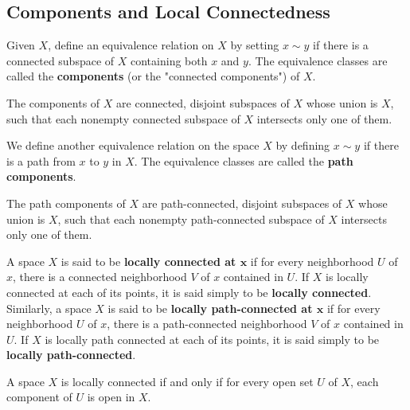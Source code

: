 \subsection{Components and Local Connectedness}\nl
\setcounter{section}{25}
\setcounter{thm}{0}

\vs

\dfn Given $X$, define an equivalence relation on $X$ by setting $x\sim y$ if there is a connected subspace of $X$ containing both $x$ and $y$. The equivalence classes are called the \textbf{components} (or the "connected components") of $X$.

\vs

\begin{thm}
The components of $X$ are connected, disjoint subspaces of $X$ whose union is $X$, such that each nonempty connected subspace of $X$ intersects only one of them.
\end{thm}

\vs

\dfn We define another equivalence relation on the space $X$ by defining $x\sim y$ if there is a path from $x$ to $y$ in $X$. The equivalence classes are called the \textbf{path components}.

\vs

\begin{thm}
The path components of $X$ are path-connected, disjoint subspaces of $X$ whose union is $X$, such that each nonempty path-connected subspace of $X$ intersects only one of them.
\end{thm}

\vs

\dfn A space $X$ is said to be \textbf{locally connected at $\boldsymbol x$} if for every neighborhood $U$ of $x$, there is a connected neighborhood $V$ of $x$ contained in $U$. If $X$ is locally connected at each of its points, it is said simply to be \textbf{locally connected}. Similarly, a space $X$ is said to be \textbf{locally path-connected at $\boldsymbol x$} if for every neighborhood $U$ of $x$, there is a path-connected neighborhood $V$ of $x$ contained in $U$. If $X$ is locally path connected at each of its points, it is said simply to be \textbf{locally path-connected}.

\vs

\begin{thm}
A space $X$ is locally connected if and only if for every open set $U$ of $X$, each component of $U$ is open in $X$.
\end{thm}

